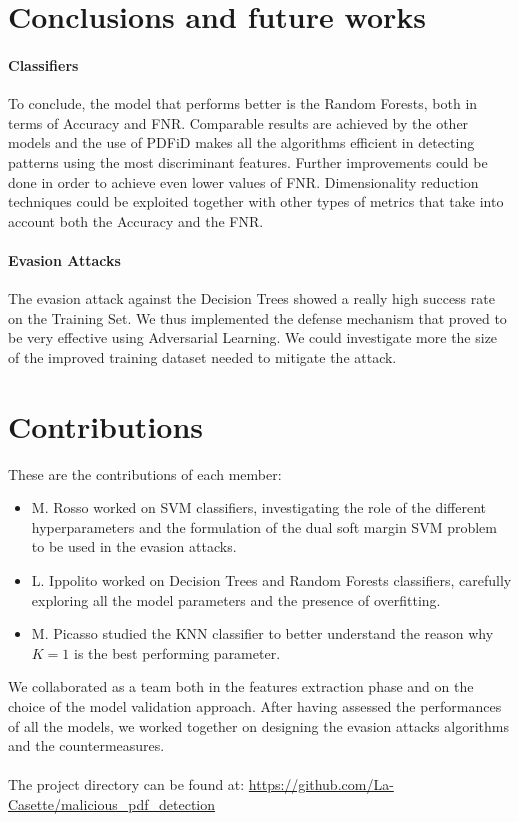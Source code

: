 \documentclass[twocolumn, switch]{article} %
\begin{document}
\section{Conclusions and future works}
\label{sec:conclusions}
\paragraph{Classifiers}
To conclude, the model that performs better is the Random Forests, both in terms of Accuracy and FNR. Comparable results are achieved by the other models and the use of PDFiD makes all the algorithms efficient in detecting patterns using the most discriminant features. Further improvements could be done in order to achieve even lower values of FNR. Dimensionality reduction techniques could be exploited together with other types of metrics that take into account both the Accuracy and the FNR.
\vspace{-5pt}
\paragraph{Evasion Attacks}
The evasion attack against the Decision Trees showed a really high success rate on the Training Set. We thus implemented the defense mechanism that proved to be very effective using Adversarial Learning. We could investigate more the size of the improved training dataset needed to mitigate the attack.
\section{Contributions}
\label{sec:contributions}
These are the contributions of each member:
\begin{itemize}
	\item M. Rosso worked on SVM classifiers, investigating the role of the different hyperparameters and the formulation of the dual soft margin SVM problem to be used in the evasion attacks.
	\item L. Ippolito worked on Decision Trees and Random Forests classifiers, carefully exploring all the model parameters and the presence of overfitting.
	\item M. Picasso studied the KNN classifier to better understand the reason why $K=1$ is the best performing parameter.
\end{itemize}
We collaborated as a team both in the features extraction phase and on the choice of the model validation approach. After having assessed the performances of all the models, we worked together on designing the evasion attacks algorithms and the countermeasures.
\\~\\
The project directory can be found at:\newline
\footnotesize{\url{https://github.com/La-Casette/malicious_pdf_detection}}
\end{document}

